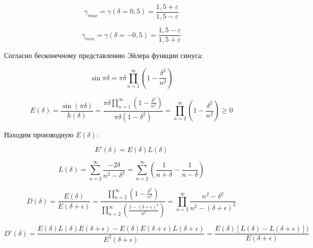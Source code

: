 \begin{equation}
\label{eq:equation69}
\gamma_{max} = \gamma(\delta = 0,5) = \frac{1,5+ \varepsilon}{1,5 - \varepsilon}
\end{equation}

\begin{equation}
\label{eq:equation70}
\gamma_{min} = \gamma(\delta = -0,5) = \frac{1,5 - \varepsilon}{1,5 + \varepsilon}
\end{equation}

Согласно бесконечному представлению Эйлера функции синуса:

\begin{equation}
	\label{eq:equation71}
	\sin \pi \delta = \pi \delta \prod\limits_{n = 1}^\infty \left( 1- \frac{\delta^2}{n^2} \right) 
\end{equation}

\begin{equation}
\label{eq:equation72}
E(\delta) = \frac{\sin(\pi \delta) }{h(\delta)} = \frac{\pi \delta \prod\limits_{n = 1}^\infty \left( 1- \frac{\delta^2}{n^2}\right)}{\pi \delta (1 - \delta^2)} = \prod\limits_{n = 2}^\infty \left( 1 - \frac{\delta^2}{n^2}\right) \geq 0 
\end{equation}

Находим производную $E(\delta)$:     

\begin{equation}
\label{eq:equation73}
E'(\delta) = E(\delta)L(\delta)
\end{equation}

\begin{equation}
\label{eq:equation74}
L(\delta) = \sum_{n=2}^{\infty} \frac{-2 \delta}{n^2 - \delta^2} = \sum_{n=2}^{\infty} \left(  \frac{1}{n + \delta} -  \frac{1}{n - \delta} \right) 
\end{equation}

\begin{equation}
\label{eq:equation75}
D(\delta) = \frac{E(\delta)}{E(\delta + \epsilon)} = \frac{\prod\limits_{n = 2}^\infty \left( 1 - \frac{\delta^2}{n^2} \right) }{\prod\limits_{n = 2}^\infty \left( \frac{1 - (\delta + \epsilon)^2}{n^2}\right)} = \prod\limits_{n = 2}^\infty \frac{n^2 - \delta^2}{n^2 - (\delta + \epsilon)^2}
\end{equation}

\begin{equation}
\label{eq:equation76}
D'(\delta) = \frac{E(\delta)L(\delta)E(\delta + \epsilon) - E(\delta)E(\delta + \epsilon)L(\delta + \epsilon)}{E^2 (\delta + \epsilon)} = \frac{E(\delta) [L(\delta) - L(\delta + \epsilon)])}{E(\delta + \epsilon)}
\end{equation}

